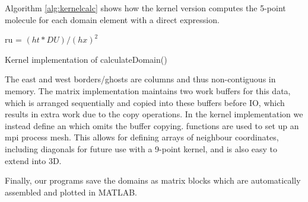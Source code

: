 \documentclass[a4paper,11pt]{article}
\renewcommand{\vec}[1]{\mathbf{#1}}
\begin{document}
Algorithm \ref{alg:kernelcalc} shows how the kernel version computes the 5-point molecule for each domain element with a direct expression.

\vspace{0.7 cm}
\begin{algorithm}[H]
\label{alg:kernelcalc}
  \SetAlgoLined
  ru = $(ht * DU) / (hx)^2$\;

  \caption{Kernel implementation of calculateDomain()}
\end{algorithm}
\vspace{0.7 cm}


The east and west borders/ghosts are columns and thus non-contiguous in memory. The matrix implementation maintains two work buffers for this data, which is arranged sequentially and copied into these buffers before IO, which results in extra work due to the copy operations. In the kernel implementation we instead define an  which omits the buffer copying.  functions are used to set up an mpi process mesh. This allows for defining arrays of neighbour coordinates, including diagonals for future use with a 9-point kernel, and is also easy to extend into 3D. 

Finally, our programs save the domains as matrix blocks which are automatically assembled and plotted in MATLAB.


\end{document}
